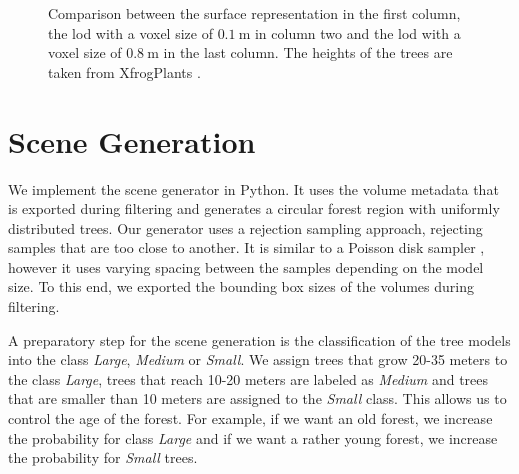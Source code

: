 \begin{figure}[t]
\begin{center}
\begin{minipage}[c]{0.24\textwidth}
        \end{minipage}
    \end{center}
    \caption[Comparison between mesh and volume renderings]{Comparison between the surface representation in the first column, the \ac{lod} with a voxel size of $\SI{0.1}{\m}$ in column two and the \ac{lod} with a voxel size of $\SI{0.8}{\m}$ in the last column. The heights of the trees are taken from XfrogPlants \cite{xfrogplants}.}
    \label{fig:lods_comparison}
\end{figure}

\section{Scene Generation}
\label{sec:scene_generation}
We implement the scene generator in Python.
It uses the volume metadata that is exported during filtering and generates a circular forest region with uniformly distributed trees.
Our generator uses a rejection sampling approach, rejecting samples that are too close to another.
It is similar to a Poisson disk sampler \cite{poisson_sampling}, however it uses varying spacing between the samples depending on the model size.
To this end, we exported the bounding box sizes of the volumes during filtering.

A preparatory step for the scene generation is the classification of the tree models into the class \textit{Large}, \textit{Medium} or \textit{Small}.
We assign trees that grow 20-35 meters to the class \textit{Large}, trees that reach 10-20 meters are labeled as \textit{Medium} and trees that are smaller than 10 meters are assigned to the \textit{Small} class.
This allows us to control the age of the forest.
For example, if we want an old forest, we increase the probability for class \textit{Large} and if we want a rather young forest, we increase the probability for \textit{Small} trees.

